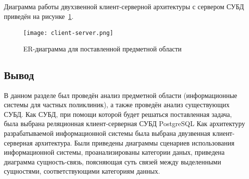 Диаграмма работы двухзвенной клиент-серверной архитектуры с сервером СУБД приведён на рисунке~\ref{fig:client-server}.


\begin{figure}[h!]
	\centering
	\captionsetup{justification=centering}
	\texttt{[image: client-server.png]}
	\caption{ER-диаграмма для поставленной предметной области}
	\label{fig:client-server}
\end{figure}

\subsection*{Вывод}
В данном разделе был проведён анализ предметной области (информационные системы для частных поликлиник), а также проведён анализ существующих СУБД. 
Как СУБД, при помощи которой будет решаться поставленная задача, была выбрана реляционная клиент-серверная СУБД PostgreSQL
Как архитектуру разрабатываемой информационной системы была выбрана двузвенная клиент-серверная архитектура. 
Были приведены диаграммы сценариев использования информационной системы, проанализированы категории даных, приведена диаграмма сущность-связь, поясняющая суть связей между выделенными сущностями, соответствующими категориям данных.


